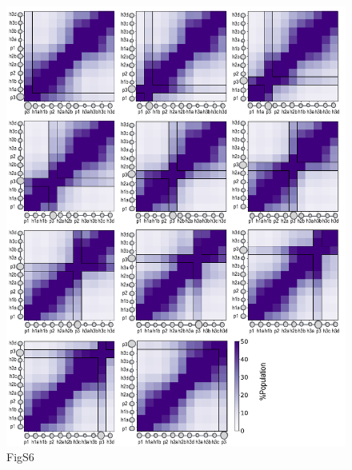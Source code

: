 \documentclass[10pt,letterpaper]{article}
\begin{document}
\begin{figure}[!ht]
\includegraphics[scale=0.5,width=\textwidth,trim={0 0cm 0 0cm},clip]{./figures/S6.pdf}
\caption{{FigS6}}
\end{figure}
\end{document}
